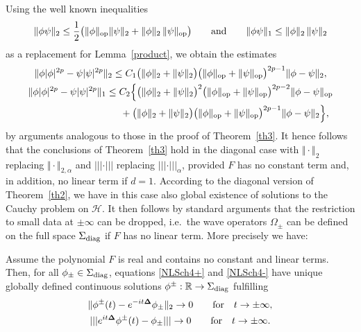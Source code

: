 \documentclass[pdftex]{sigma}
\begin{document}
Using the well known inequalities
\begin{gather*}
\Vert\phi \psi\Vert_2 \leq \frac12\big(\Vert\phi\Vert_{\rm op} \Vert\psi\Vert_2 +
\Vert\phi\Vert_2\,\Vert\psi\Vert_{\rm op}\big)\qquad\mbox{and}\qquad
\Vert\phi \psi\Vert_1\leq\Vert\phi\Vert_2\,\Vert\psi\Vert_2
\end{gather*}
as a replacement for Lemma~\ref{product}, we obtain the estimates
\begin{gather*}
\Vert\phi |\phi|^{2p}-\psi |\psi|^{2p}\Vert_2
 \leq  C_1 \big(\Vert\phi\Vert_2+\Vert\psi\Vert_2\big)
\big(\Vert\phi\Vert_{\rm op}+\Vert\psi\Vert_{\rm op}\big)^{2p-1}\Vert\phi-\psi\Vert_2 ,\\
\Vert\phi |\phi|^{2p}-\psi |\psi|^{2p}\Vert_{1}
\leq C_2
\Big\{\big(\Vert\phi\Vert_2+\Vert\psi\Vert_2\big)^2
\big(\Vert\phi\Vert_{\rm op}+\Vert\psi\Vert_{\rm op}\big)^{2p-2}\Vert\phi-\psi\Vert_{\rm op}\\
\hphantom{\Vert\phi |\phi|^{2p}-\psi |\psi|^{2p}\Vert_{1} \leq}{}
+
\big(\Vert\phi\Vert_2+\Vert\psi\Vert_2\big)
\big(\Vert\phi\Vert_{\rm op}+\Vert\psi\Vert_{\rm op}\big)^{2p-1}\Vert\phi-\psi\Vert_2\Big\} ,
\end{gather*}
by arguments analogous to those in the proof of
Theorem~\ref{th3}. It hence follows that the conclusions of
Theorem~\ref{th3} hold in the diagonal case with $\Vert\cdot\Vert_2$ replacing
$\Vert\cdot\Vert_{2,\alpha}$ and $|||\cdot|||$ replacing
$|||\cdot|||_\alpha$, provided $F$ has no constant term and, in addition, no
linear term if $d=1$. According to the diagonal version of
Theorem~\ref{th2}, we have in this
case also global existence of solutions to the Cauchy problem on
$\mathcal H$. It then follows by standard arguments \cite[Theorem 19]{Reed}
that the restriction to small data at $\pm\infty$ can be dropped,
i.e.\ the wave operators $\Omega_\pm$ can be def\/ined on the full space
$\Sigma_{\rm diag}$ if $F$ has no linear term. More precisely we have:

\begin{theorem}\label{th4} Assume the polynomial $F$ is real and contains
no constant and linear terms. Then, for all $\phi_\pm\in\Sigma_{\rm diag}$,
equations \eqref{NLSch4+} and \eqref{NLSch4-} have unique globally
defined continuous solutions $\phi^\pm:\mathbb R\to \Sigma_{\rm diag}$ fulfilling
\begin{gather}
\Vert\phi^\pm(t)-e^{-it{\bf\Delta}}\phi_\pm\Vert_{2}  \to
0\qquad\mbox{for}\quad t\to\pm\infty ,\label{decay1}\\
 |||e^{it{\bf\Delta}}\phi^\pm(t)-\phi_\pm |||  \to
0\qquad\mbox{for}\quad t\to\pm\infty .\nonumber%
\end{gather}
\end{theorem}
\end{document}
